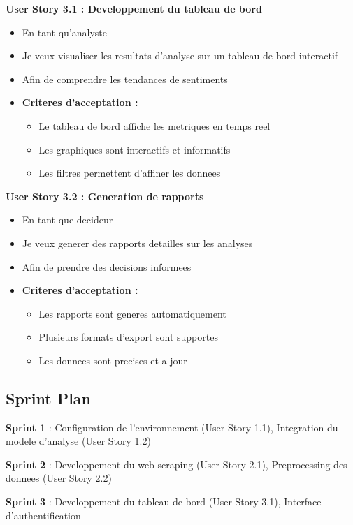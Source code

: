 \textbf{User Story 3.1 : Developpement du tableau de bord}
\begin{itemize}
    \item En tant qu'analyste
    \item Je veux visualiser les resultats d'analyse sur un tableau de bord interactif
    \item Afin de comprendre les tendances de sentiments
    \item \textbf{Criteres d'acceptation :}
    \begin{itemize}
        \item Le tableau de bord affiche les metriques en temps reel
        \item Les graphiques sont interactifs et informatifs
        \item Les filtres permettent d'affiner les donnees
    \end{itemize}
\end{itemize}

\textbf{User Story 3.2 : Generation de rapports}
\begin{itemize}
    \item En tant que decideur
    \item Je veux generer des rapports detailles sur les analyses
    \item Afin de prendre des decisions informees
    \item \textbf{Criteres d'acceptation :}
    \begin{itemize}
        \item Les rapports sont generes automatiquement
        \item Plusieurs formats d'export sont supportes
        \item Les donnees sont precises et a jour
    \end{itemize}
\end{itemize}

\subsection{Sprint Plan}

\textbf{Sprint 1} : Configuration de l'environnement (User Story 1.1), Integration du modele d'analyse (User Story 1.2)

\textbf{Sprint 2} : Developpement du web scraping (User Story 2.1), Preprocessing des donnees (User Story 2.2)

\textbf{Sprint 3} : Developpement du tableau de bord (User Story 3.1), Interface d'authentification

